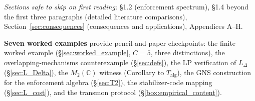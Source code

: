\documentclass[11pt]{article}
\theoremstyle{remark}
\begin{document}
\smallskip\noindent\textit{Sections safe to skip on first reading:} \S1.2 (enforcement spectrum), \S1.4 beyond the first three paragraphs (detailed literature comparisons), Section~\ref{sec:consequences} (consequences and applications), Appendices A--H.

\medskip\noindent\textbf{Seven worked examples} provide pencil-and-paper checkpoints: the finite worked example (\S\ref{sec:worked_example}, $C=5$, three distinctions), the overlapping-mechanisms counterexample (\S\ref{sec:defs}), the LP verification of $L_\Delta$ (\S\ref{sec:L_Delta}), the $M_2(\mathbb{C})$ witness (Corollary to $T_{\mathrm{alg}}$), the GNS construction for the enforcement algebra (\S\ref{sec:T2}), the stabilizer-code mapping (\S\ref{sec:L_cost}), and the transmon protocol (\S\ref{box:empirical_content}).

\smallskip
\end{document}
